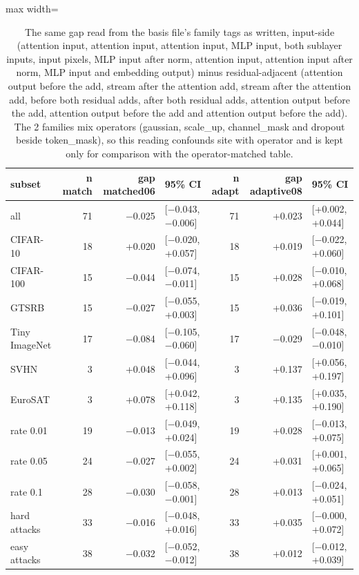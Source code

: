 \begin{table}[htbp]
\centering
\small
\caption{The same gap read from the basis file's family tags as written, input-side (attention input, attention input, attention input, MLP input, both sublayer inputs, input pixels, MLP input after norm, attention input, attention input after norm, MLP input and embedding output) minus residual-adjacent (attention output before the add, stream after the attention add, stream after the attention add, before both residual adds, after both residual adds, attention output before the add, attention output before the add and attention output before the add). The 2 families mix operators (gaussian, scale_up, channel_mask and dropout beside token_mask), so this reading confounds site with operator and is kept only for comparison with the operator-matched table.}
\label{tab:family-split-confounded}
\begin{adjustbox}{max width=\linewidth}
\begin{tabular}{lrrlrrl}
\toprule
subset & n match & gap matched06 & 95\% CI & n adapt & gap adaptive08 & 95\% CI \\
\midrule
all & 71 & $-$0.025 & [$-$0.043, $-$0.006] & 71 & +0.023 & [+0.002, +0.044] \\
CIFAR-10 & 18 & +0.020 & [$-$0.020, +0.057] & 18 & +0.019 & [$-$0.022, +0.060] \\
CIFAR-100 & 15 & $-$0.044 & [$-$0.074, $-$0.011] & 15 & +0.028 & [$-$0.010, +0.068] \\
GTSRB & 15 & $-$0.027 & [$-$0.055, +0.003] & 15 & +0.036 & [$-$0.019, +0.101] \\
Tiny ImageNet & 17 & $-$0.084 & [$-$0.105, $-$0.060] & 17 & $-$0.029 & [$-$0.048, $-$0.010] \\
SVHN & 3 & +0.048 & [$-$0.044, +0.096] & 3 & +0.137 & [+0.056, +0.197] \\
EuroSAT & 3 & +0.078 & [+0.042, +0.118] & 3 & +0.135 & [+0.035, +0.190] \\
rate 0.01 & 19 & $-$0.013 & [$-$0.049, +0.024] & 19 & +0.028 & [$-$0.013, +0.075] \\
rate 0.05 & 24 & $-$0.027 & [$-$0.055, +0.002] & 24 & +0.031 & [+0.001, +0.065] \\
rate 0.1 & 28 & $-$0.030 & [$-$0.058, $-$0.001] & 28 & +0.013 & [$-$0.024, +0.051] \\
hard attacks & 33 & $-$0.016 & [$-$0.048, +0.016] & 33 & +0.035 & [$-$0.000, +0.072] \\
easy attacks & 38 & $-$0.032 & [$-$0.052, $-$0.012] & 38 & +0.012 & [$-$0.012, +0.039] \\
\bottomrule
\end{tabular}
\end{adjustbox}
\end{table}
